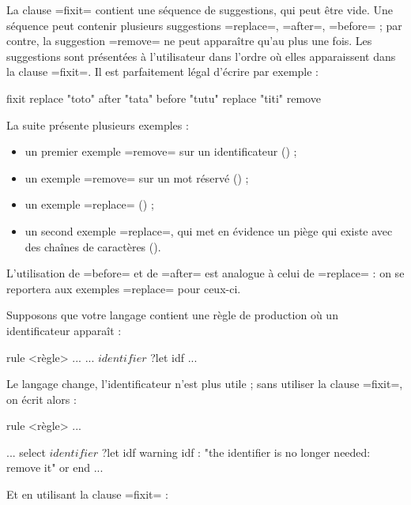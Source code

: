La clause \ggs=fixit= contient une séquence de suggestions, qui peut être vide. Une séquence peut contenir plusieurs suggestions \ggs=replace=, \ggs=after=, \ggs=before= ; par contre, la suggestion \ggs=remove= ne peut apparaître qu'au plus une fois. Les suggestions sont présentées à l'utilisateur dans l'ordre où elles apparaissent dans la clause \ggs=fixit=. Il est parfaitement légal d'écrire par exemple :
\begin{galgas}
fixit {
  replace "toto"
  after "tata"
  before "tutu"
  replace "titi"
  remove
}
\end{galgas}


La suite présente plusieurs exemples :
\begin{itemize}
  \item un premier exemple \ggs=remove= sur un identificateur () ;
  \item un exemple  \ggs=remove= sur un mot réservé () ;
  \item un exemple \ggs=replace= () ;
  \item un second exemple \ggs=replace=, qui met en évidence un piège qui existe avec des chaînes de caractères ().
\end{itemize}

L'utilisation de \ggs=before= et de \ggs=after= est analogue à celui de \ggs=replace= : on se reportera aux exemples \ggs=replace= pour ceux-ci.



Supposons que votre langage contient une règle de production où un identificateur apparaît :

\begin{galgas}
rule <règle> ... {
  ...
  $identifier$ ?let idf
  ...
}
\end{galgas}

Le langage change, l'identificateur n'est plus utile ; sans utiliser la clause \ggs=fixit=, on écrit alors :

\begin{galgas}
rule <règle> ... {
  ...
  select
    $identifier$ ?let idf
    warning idf : "the identifier is no longer needed: remove it"
  or
  end
  ...
  
}
\end{galgas}


Et en utilisant la clause \ggs=fixit= :

